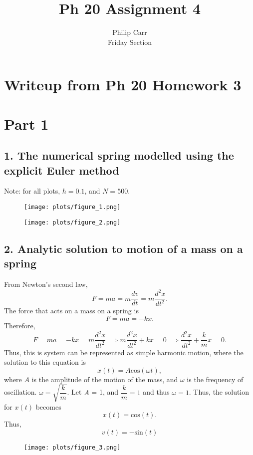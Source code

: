 \documentclass{article}
\title{Ph 20 Assignment 4}
\author{Philip Carr\\Friday Section}
\date{}
\begin{document}
\maketitle

\section*{Writeup from Ph 20 Homework 3}

\section*{Part 1}
\subsection*{1. The numerical spring modelled using the explicit Euler method}
Note: for all plots, $h = 0.1$, and $N = 500$.

\begin{figure}[H]
\centering
\texttt{[image: plots/figure\_1.png]}
\end{figure}

\begin{figure}[H]
\centering
\texttt{[image: plots/figure\_2.png]}
\end{figure}

\subsection*{2. Analytic solution to motion of a mass on a spring}
From Newton's second law,
\[ F = ma = m\dfrac{dv}{dt} = m\dfrac{d^2 x}{dt^2}. \]
The force that acts on a mass on a spring is
\[ F = ma = -kx. \]
Therefore,
\[ F = ma = -kx = m\dfrac{d^2 x}{dt^2} \implies m\dfrac{d^2 x}{dt^2} + kx = 0 \implies \dfrac{d^2 x}{dt^2} + \dfrac{k}{m}x = 0. \]
Thus, this is system can be represented as simple harmonic motion, where the solution to this equation is
\[ x(t) = A\text{cos}(\omega t), \]
where $A$ is the amplitude of the motion of the mass, and $\omega$ is the frequency of oscillation. $\omega = \sqrt{\dfrac{k}{m}}$. Let $A$ = 1, and $\dfrac{k}{m} = 1$ and thus $\omega = 1$. Thus, the solution for $x(t)$ becomes
\[ x(t) = \text{cos}(t). \]
Thus,
\[ v(t) = -\text{sin}(t) \]

\begin{figure}[H]
\centering
\texttt{[image: plots/figure\_3.png]}
\end{figure}
\end{document}
